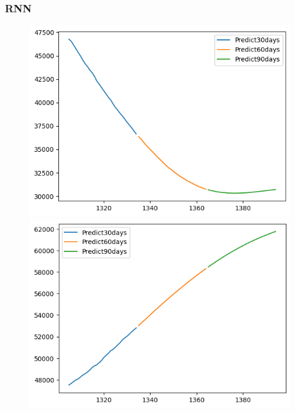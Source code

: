 \subsubsection{RNN}
\begin{figure}[H]
    \centering
    \begin{minipage}{0.15\textwidth}
    \centering
    \includegraphics[width=1\textwidth]{resources/chapter-5/newdata1/predicted/BIDV_ RNN_7-3_30days.png}
    \end{minipage}
    \hfill
    \begin{minipage}{0.15\textwidth}
    \centering
    \includegraphics[width=1\textwidth]{resources/chapter-5/newdata1/predicted/BIDV_ RNN_8-2_30days.png}
    \end{minipage}

\end{figure}
